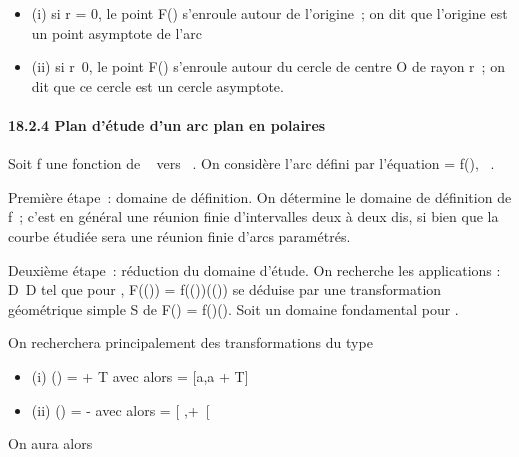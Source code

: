 \documentclass[]{article}
\begin{document}
\begin{itemize}
\itemsep1pt\parskip0pt
\item
  (i) si r = 0, le point F(\theta) s'enroule autour de l'origine~; on dit que
  l'origine est un point asymptote de l'arc
\item
  (ii) si r\neq~0, le point F(\theta) s'enroule autour
  du cercle de centre O de rayon \textbar{}r\textbar{}~; on dit que ce
  cercle est un cercle asymptote.
\end{itemize}

\paragraph{18.2.4 Plan d'étude d'un arc plan en polaires}

Soit f une fonction de ~ vers ~. On considère l'arc défini par
l'équation \rho = f(\theta), \theta \in {}~.

Première étape~: domaine de définition. On détermine le domaine de
définition de f~; c'est en général une réunion finie d'intervalles deux
à deux dis\jmathoints, si bien que la courbe étudiée sera une réunion finie
d'arcs paramétrés.

Deuxième étape~: réduction du domaine d'étude. On recherche les
applications \sigma : D\rightarrow~D tel que pour \theta \inD, F(\sigma(\theta)) =
f(\sigma(\theta))\vecu(\sigma(\theta)) se déduise par une transformation
géométrique simple S de F(\theta) = f(\theta)\vecu(\theta). Soit \Delta
un domaine fondamental pour \sigma.

On recherchera principalement des transformations \theta du type

\begin{itemize}
\itemsep1pt\parskip0pt
\item
  (i) \sigma(\theta) = \theta + T avec alors \Delta = {[}a,a + T{]} \bigcapD
\item
  (ii) \sigma(\theta) = \omega - \theta avec alors \Delta = {[} \omega {}
  ,+\infty~{[}\bigcapD
\end{itemize}

On aura alors
\end{document}
